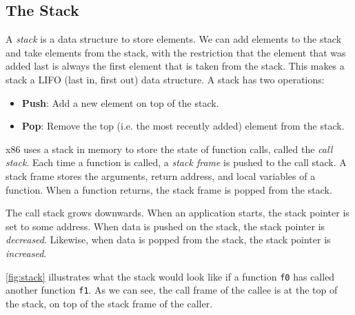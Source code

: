 
\subsection{The Stack}\label{section:stack}
A \emph{stack} is a data structure to store elements. We can add elements to the stack and take elements from the stack, with the restriction that the element that was added last is always the first element that is taken from the stack. This makes a stack a LIFO (last in, first out) data structure. A stack has two operations:
\begin{itemize}
   \item \textbf{Push}: Add a new element on top of the stack.

   \item \textbf{Pop}: Remove the top (i.e. the most recently added) element from the stack.
\end{itemize}

x86 uses a stack in memory to store the state of function calls, called the \emph{call stack}. Each time a function is called, a \emph{stack frame} is pushed to the call stack. A stack frame stores the arguments, return address, and local variables of a function. When a function returns, the stack frame is popped from the stack.

The call stack grows downwards. When an application starts, the stack pointer is set to some address. When data is pushed on the stack, the stack pointer is \emph{decreased}. Likewise, when data is popped from the stack, the stack pointer is \emph{increased}.

\autoref{fig:stack} illustrates what the stack would look like if a function \texttt{f0} has called another function \texttt{f1}. As we can see, the call frame of the callee is at the top of the stack, on top of the stack frame of the caller.

